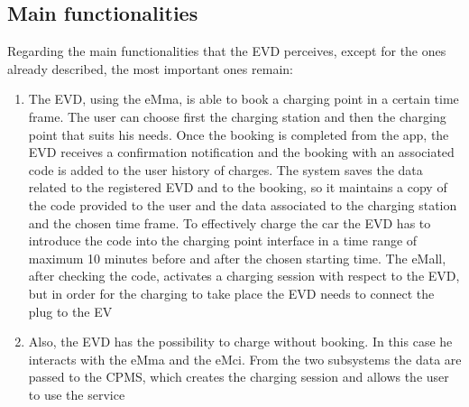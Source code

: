 \subsection{Main functionalities}
Regarding the main functionalities that the EVD perceives, except for the ones already described, the most important ones remain:
\begin{enumerate}
    \item The EVD, using the eMma, is able to book a charging point in a certain time frame. The user can choose first the charging station and then the charging point that suits his needs. Once the booking is completed from the app, the EVD receives a confirmation notification and the booking with an associated code is added to the user history of charges. The system saves the data related to the registered EVD and to the booking, so it maintains a copy of the code provided to the user and the data associated to the charging station and the chosen time frame. To effectively charge the car the EVD has to introduce the code into the charging point interface in a time range of maximum 10 minutes before and after the chosen starting time. The eMall, after checking the code, activates a charging session with respect to the EVD, but in order for the charging to take place the EVD needs to connect the plug to the EV
    \item Also, the EVD has the possibility to charge without booking. In this case he interacts with the eMma and the eMci. From the two subsystems the data are passed to the CPMS, which creates the charging session and allows the user to use the service
\end{enumerate}